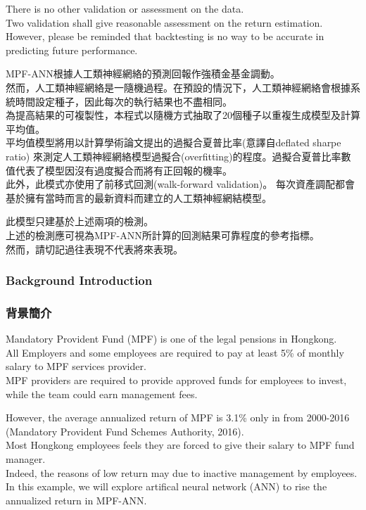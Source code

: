 \documentclass[
]{article}
\begin{document}
There is no other validation or assessment on the data.\\
Two validation shall give reasonable assessment on the return
estimation.\\
However, please be reminded that backtesting is no way to be accurate in
predicting future performance.

MPF-ANN根據人工類神經網絡的預測回報作強積金基金調動。\\
然而，人工類神經網絡是一隨機過程。在預設的情況下，人工類神經網絡會根據系統時間設定種子，因此每次的執行結果也不盡相同。\\
為提高結果的可複製性，本程式以隨機方式抽取了20個種子以重複生成模型及計算平均值。\\
平均值模型將用以計算學術論文提出的過擬合夏普比率(意譯自deflated sharpe
ratio)
來測定人工類神經網絡模型過擬合(overfitting)的程度。過擬合夏普比率數值代表了模型因沒有過度擬合而將有正回報的機率。\\
此外，此模式亦使用了前移式回測(walk-forward validation)。
每次資產調配都會基於擁有當時而言的最新資料而建立的人工類神經網結模型。

此模型只建基於上述兩項的檢測。\\
上述的檢測應可視為MPF-ANN所計算的回測結果可靠程度的參考指標。\\
然而，請切記過往表現不代表將來表現。

\hypertarget{background-introduction}{%
\subsubsection{Background Introduction}\label{background-introduction}}

\hypertarget{ux80ccux666fux7c21ux4ecb}{%
\subsubsection{背景簡介}\label{ux80ccux666fux7c21ux4ecb}}

Mandatory Provident Fund (MPF) is one of the legal pensions in
Hongkong.\\
All Employers and some employees are required to pay at least 5\% of
monthly salary to MPF services provider.\\
MPF providers are required to provide approved funds for employees to
invest, while the team could earn management fees.

However, the average annualized return of MPF is 3.1\% only in from
2000-2016 (Mandatory Provident Fund Schemes Authority, 2016).\\
Most Hongkong employees feels they are forced to give their salary to
MPF fund manager.\\
Indeed, the reasons of low return may due to inactive management by
employees.\\
In this example, we will explore artifical neural network (ANN) to rise
the annualized return in MPF-ANN.
\end{document}
